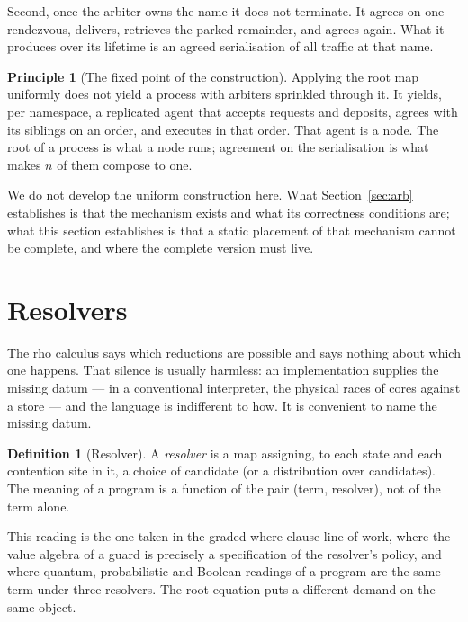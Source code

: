 \documentclass[11pt]{article}
\theoremstyle{definition}
\newtheorem{definition}[theorem]{Definition}
\newtheorem{principle}[theorem]{Principle}
\newcommand{\rhoc}{rho calculus}
\begin{document}
Second, once the arbiter owns the name it does not terminate. It agrees on one rendezvous, delivers, retrieves the parked remainder, and agrees again. What it produces over its lifetime is an agreed serialisation of all traffic at that name.

\begin{principle}[The fixed point of the construction]
Applying the root map uniformly does not yield a process with arbiters sprinkled through it. It yields, per namespace, a replicated agent that accepts requests and deposits, agrees with its siblings on an order, and executes in that order. That agent is a node. The root of a process is what a node runs; agreement on the serialisation is what makes $n$ of them compose to one.
\end{principle}

We do not develop the uniform construction here. What Section~\ref{sec:arb} establishes is that the mechanism exists and what its correctness conditions are; what this section establishes is that a static placement of that mechanism cannot be complete, and where the complete version must live.

\section{Resolvers}\label{sec:resolver}

The \rhoc{} says which reductions are possible and says nothing about which one happens. That silence is usually harmless: an implementation supplies the missing datum --- in a conventional interpreter, the physical races of cores against a store --- and the language is indifferent to how. It is convenient to name the missing datum.

\begin{definition}[Resolver]
A \emph{resolver} is a map assigning, to each state and each contention site in it, a choice of candidate (or a distribution over candidates). The meaning of a program is a function of the pair (term, resolver), not of the term alone.
\end{definition}

This reading is the one taken in the graded where-clause line of work, where the value algebra of a guard is precisely a specification of the resolver's policy, and where quantum, probabilistic and Boolean readings of a program are the same term under three resolvers. The root equation puts a different demand on the same object.
\end{document}
